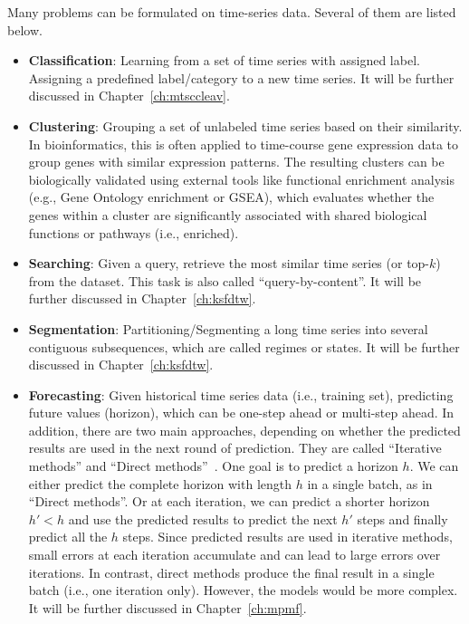 Many problems can be formulated on time-series data.
Several of them are listed below.
\begin{itemize}
    \item \textbf{Classification}: Learning from a set of time series with assigned label. Assigning a predefined label/category to a new time series. It will be further discussed in Chapter~\ref{ch:mtsccleav}.
    \item \textbf{Clustering}: Grouping a set of unlabeled time series based on their similarity. In bioinformatics, this is often applied to time-course gene expression data to group genes with similar expression patterns. The resulting clusters can be biologically validated using external tools like functional enrichment analysis (e.g., Gene Ontology enrichment or GSEA), which evaluates whether the genes within a cluster are significantly associated with shared biological functions or pathways (i.e., enriched).
    \item \textbf{Searching}: Given a query, retrieve the most similar time series (or top-$k$) from the dataset. This task is also called ``query-by-content''. It will be further discussed in Chapter~\ref{ch:ksfdtw}.
    \item \textbf{Segmentation}: Partitioning/Segmenting a long time series into several contiguous subsequences, which are called regimes or states. It will be further discussed in Chapter~\ref{ch:ksfdtw}.
    \item \textbf{Forecasting}: Given historical time series data (i.e., training set), predicting future values (horizon), which can be one-step ahead or multi-step ahead.
    In addition, there are two main approaches, depending on whether the predicted results are used in the next round of prediction.
    They are called ``Iterative methods'' and ``Direct methods''~\cite{lim2021timeseries}.
    One goal is to predict a horizon $h$.
    We can either predict the complete horizon with length $h$ in a single batch, as in ``Direct methods''.
    Or at each iteration, we can predict a shorter horizon $h' < h$ and use the predicted results to predict the next $h'$ steps and finally predict all the $h$ steps.
    Since predicted results are used in iterative methods, small errors at each iteration accumulate and can lead to large errors over iterations.
    In contrast, direct methods produce the final result in a single batch (i.e., one iteration only). However, the models would be more complex.
    It will be further discussed in Chapter~\ref{ch:mpmf}.
\end{itemize}

